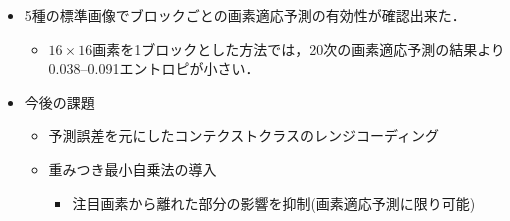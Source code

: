 \documentclass[25pt, landscape,dvipdfmx]{foils}
\begin{document}

 \begin{itemize}
  \item {\large } 5種の標準画像でブロックごとの画素適応予測の有効性が確認出来た．
  \begin{itemize}
   \item $16\times16$画素を1ブロックとした方法では，20次の画素適応予測の結果より0.038--0.091エントロピが小さい．
  \end{itemize}
  \item 今後の課題
  \begin{itemize}
   \item 予測誤差を元にしたコンテクストクラスのレンジコーディング
   \item 重みつき最小自乗法の導入
   \begin{itemize}
    \item 注目画素から離れた部分の影響を抑制(画素適応予測に限り可能)
   \end{itemize}
  \end{itemize}
 \end{itemize}
\end{document}
